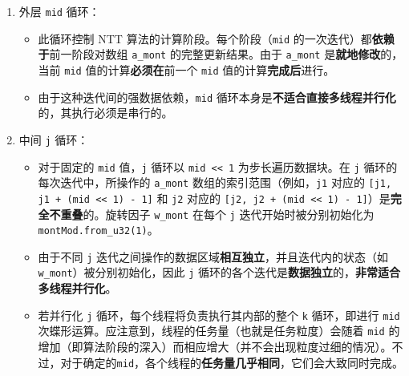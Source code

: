 \documentclass[a4paper]{article}
\begin{document}
\begin{enumerate}
\item 外层 \texttt{mid} 循环：
  \begin{itemize}
    \item 此循环控制 NTT 算法的计算阶段。每个阶段（\texttt{mid} 的一次迭代）都\textbf{依赖于}前一阶段对数组 \texttt{a\_mont} 的完整更新结果。由于 \texttt{a\_mont} 是\textbf{就地修改}的，当前 \texttt{mid} 值的计算\textbf{必须在}前一个 \texttt{mid} 值的计算\textbf{完成后}进行。
    \item 由于这种迭代间的强数据依赖，\texttt{mid} 循环本身是\textbf{不适合直接多线程并行化}的，其执行必须是串行的。
  \end{itemize}

\item 中间 \texttt{j} 循环：
  \begin{itemize}
    \item 对于固定的 \texttt{mid} 值，\texttt{j} 循环以 \texttt{mid << 1} 为步长遍历数据块。在 \texttt{j} 循环的每次迭代中，所操作的 \texttt{a\_mont} 数组的索引范围（例如，\texttt{j1} 对应的 \texttt{[j1, j1 + (mid << 1) - 1]} 和 \texttt{j2} 对应的 \texttt{[j2, j2 + (mid << 1) - 1]}）是\textbf{完全不重叠}的。旋转因子 \texttt{w\_mont} 在每个 \texttt{j} 迭代开始时被分别初始化为 \texttt{montMod.from\_u32(1)}。
    \item 由于不同 \texttt{j} 迭代之间操作的数据区域\textbf{相互独立}，并且迭代内的状态（如 \texttt{w\_mont}）被分别初始化，因此 \texttt{j} 循环的各个迭代是\textbf{数据独立}的，\textbf{非常适合多线程并行化}。
    \item 若并行化 \texttt{j} 循环，每个线程将负责执行其内部的整个 \texttt{k} 循环，即进行 \texttt{mid} 次蝶形运算。应注意到，线程的任务量（也就是任务粒度）会随着 \texttt{mid} 的增加（即算法阶段的深入）而相应增大（并不会出现粒度过细的情况）。不过，对于确定的\texttt{mid}，各个线程的\textbf{任务量几乎相同}，它们会大致同时完成。
  \end{itemize}


\end{enumerate}
\end{document}
